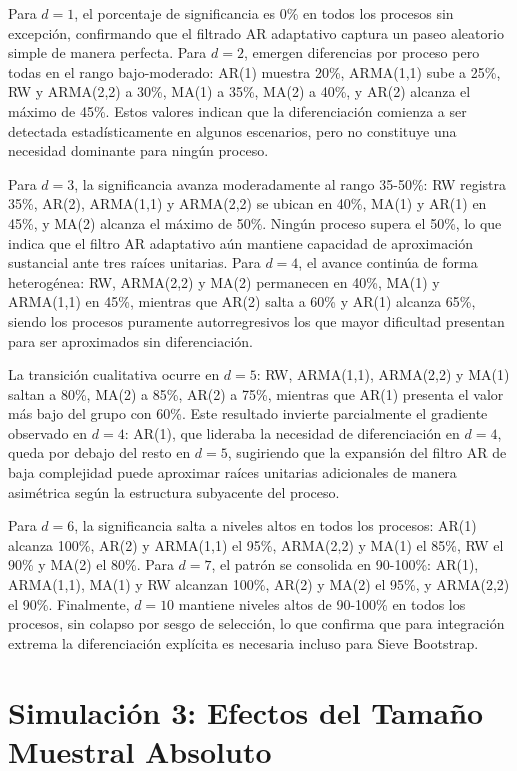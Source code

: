 Para $d = 1$, el porcentaje de significancia es 0\% en todos los procesos sin excepción, confirmando que el filtrado AR adaptativo captura un paseo aleatorio simple de manera perfecta. Para $d = 2$, emergen diferencias por proceso pero todas en el rango bajo-moderado: AR(1) muestra 20\%, ARMA(1,1) sube a 25\%, RW y ARMA(2,2) a 30\%, MA(1) a 35\%, MA(2) a 40\%, y AR(2) alcanza el máximo de 45\%. Estos valores indican que la diferenciación comienza a ser detectada estadísticamente en algunos escenarios, pero no constituye una necesidad dominante para ningún proceso.

Para $d = 3$, la significancia avanza moderadamente al rango 35-50\%: RW registra 35\%, AR(2), ARMA(1,1) y ARMA(2,2) se ubican en 40\%, MA(1) y AR(1) en 45\%, y MA(2) alcanza el máximo de 50\%. Ningún proceso supera el 50\%, lo que indica que el filtro AR adaptativo aún mantiene capacidad de aproximación sustancial ante tres raíces unitarias. Para $d = 4$, el avance continúa de forma heterogénea: RW, ARMA(2,2) y MA(2) permanecen en 40\%, MA(1) y ARMA(1,1) en 45\%, mientras que AR(2) salta a 60\% y AR(1) alcanza 65\%, siendo los procesos puramente autorregresivos los que mayor dificultad presentan para ser aproximados sin diferenciación.

La transición cualitativa ocurre en $d = 5$: RW, ARMA(1,1), ARMA(2,2) y MA(1) saltan a 80\%, MA(2) a 85\%, AR(2) a 75\%, mientras que AR(1) presenta el valor más bajo del grupo con 60\%. Este resultado invierte parcialmente el gradiente observado en $d = 4$: AR(1), que lideraba la necesidad de diferenciación en $d = 4$, queda por debajo del resto en $d = 5$, sugiriendo que la expansión del filtro AR de baja complejidad puede aproximar raíces unitarias adicionales de manera asimétrica según la estructura subyacente del proceso.

Para $d = 6$, la significancia salta a niveles altos en todos los procesos: AR(1) alcanza 100\%, AR(2) y ARMA(1,1) el 95\%, ARMA(2,2) y MA(1) el 85\%, RW el 90\% y MA(2) el 80\%. Para $d = 7$, el patrón se consolida en 90-100\%: AR(1), ARMA(1,1), MA(1) y RW alcanzan 100\%, AR(2) y MA(2) el 95\%, y ARMA(2,2) el 90\%. Finalmente, $d = 10$ mantiene niveles altos de 90-100\% en todos los procesos, sin colapso por sesgo de selección, lo que confirma que para integración extrema la diferenciación explícita es necesaria incluso para Sieve Bootstrap.

\section{Simulación 3: Efectos del Tamaño Muestral Absoluto}
\label{sec:resultados_tamano_muestral}

